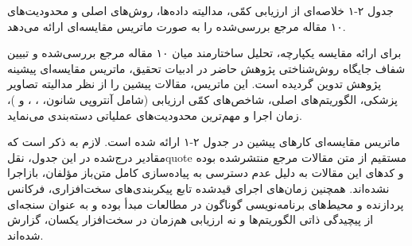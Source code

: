 

جدول ۲{-}۱ خلاصه‌ای از ارزیابی کمّی، مدالیته داده‌ها، روش‌های اصلی و محدودیت‌های ۱۰ مقاله مرجع بررسی‌شده را به صورت ماتریس مقایسه‌ای ارائه می‌دهد.\par









برای ارائه مقایسه یکپارچه، تحلیل ساختارمند میان ۱۰ مقاله مرجع بررسی‌شده و تبیین شفاف جایگاه روش‌شناختی پژوهش حاضر در ادبیات تحقیق، ماتریس مقایسه‌ای پیشینه پژوهش تدوین گردیده است. این ماتریس، مقالات پیشین را از نظر مدالیته تصاویر پزشکی، الگوریتم‌های اصلی، شاخص‌های کمّی ارزیابی (شامل آنتروپی شانون، ، ،  و )، زمان اجرا و مهم‌ترین محدودیت‌های عملیاتی دسته‌بندی می‌نماید.\par



ماتریس مقایسه‌ای کارهای پیشین در جدول ۲{-}۱ ارائه شده است. لازم به ذکر است که مقادیر درج‌شده در این جدول، نقل‌quote مستقیم از متن مقالات مرجع منتشرشده بوده و کدهای این مقالات به دلیل عدم دسترسی به پیاده‌سازی کامل متن‌باز مؤلفان، بازاجرا نشده‌اند. همچنین زمان‌های اجرای قیدشده تابع پیکربندی‌های سخت‌افزاری، فرکانس پردازنده و محیط‌های برنامه‌نویسی گوناگون در مطالعات مبدأ بوده و به عنوان سنجه‌ای از پیچیدگی ذاتی الگوریتم‌ها و نه ارزیابی هم‌زمان در سخت‌افزار یکسان، گزارش شده‌اند.\par

